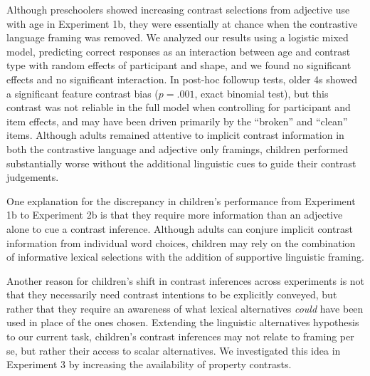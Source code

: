 \documentclass[10pt,letterpaper]{article}
\begin{document}
Although preschoolers showed increasing contrast selections from adjective use with age in Experiment 1b, they were essentially at chance when the contrastive language framing was removed.  We analyzed our results using a logistic mixed model, predicting correct responses as an interaction between age and contrast type with random effects of participant and shape, and we found no significant effects and no significant interaction. In post-hoc followup tests, older 4s showed a significant feature contrast bias ($p  = .001$, exact binomial test), but this contrast was not reliable in the full model when controlling for participant and item effects, and may have been driven primarily by the ``broken'' and ``clean'' items. Although adults remained attentive to implicit contrast information in both the contrastive language and adjective only framings, children performed substantially worse without the additional linguistic cues to guide their contrast judgements.  






One explanation for the discrepancy in children's performance from Experiment 1b to Experiment 2b is that they require more information than an adjective alone to cue a contrast inference.  Although adults can conjure implicit contrast information from individual word choices, children may rely on the combination of informative lexical selections with the addition of supportive linguistic framing.  

Another reason for children's shift in contrast inferences across experiments is not that they necessarily need contrast intentions to be explicitly conveyed, but rather that they require an awareness of what lexical alternatives \emph{could} have been used in place of the ones chosen.  Extending the linguistic alternatives hypothesis to our current task, children's contrast inferences may not relate to framing per se, but rather their access to scalar alternatives.  We investigated this idea in Experiment 3 by increasing the availability of property contrasts. 


\end{document}
